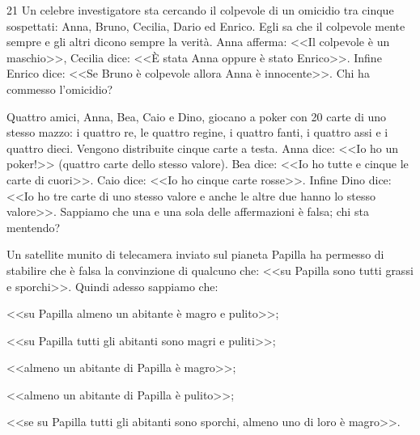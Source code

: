 \begin{esercizio}
\label{ese:1.21}
 21   Un celebre investigatore sta cercando il colpevole di un omicidio tra cinque sospettati: Anna, Bruno, Cecilia, Dario ed Enrico. Egli sa che il colpevole mente sempre e gli altri dicono sempre la verità. Anna afferma: <<Il colpevole è un maschio>>, Cecilia dice: <<\`E stata Anna oppure è stato Enrico>>. Infine Enrico dice: <<Se Bruno è colpevole allora Anna è innocente>>. Chi ha commesso l'omicidio?
\end{esercizio}

\begin{esercizio}
\label{ese:1.22}
Quattro amici, Anna, Bea, Caio e Dino, giocano a poker con 20 carte di uno stesso mazzo: i quattro re, le quattro regine, i quattro fanti, i quattro assi e i quattro dieci. Vengono distribuite cinque carte a testa. Anna dice: <<Io ho un poker!>> (quattro carte dello stesso valore). Bea dice: <<Io ho tutte e cinque le carte di cuori>>. Caio dice: <<Io ho cinque carte rosse>>. Infine Dino dice: <<Io ho tre carte di uno stesso valore e anche le altre due hanno lo stesso valore>>. Sappiamo che una e una sola delle affermazioni è falsa; chi sta mentendo?
\end{esercizio}

\begin{esercizio}
\label{ese:1.23}
Un satellite munito di telecamera inviato sul pianeta Papilla ha permesso di stabilire che è falsa la convinzione di qualcuno che: <<su Papilla sono tutti grassi e sporchi>>. Quindi adesso sappiamo che:
\begin{enumeratea}
\item <<su Papilla almeno un abitante è magro e pulito>>;
\item <<su Papilla tutti gli abitanti sono magri e puliti>>;
\item <<almeno un abitante di Papilla è magro>>;
\item <<almeno un abitante di Papilla è pulito>>;
\item <<se su Papilla tutti gli abitanti sono sporchi, almeno uno di loro è magro>>.
\end{enumeratea}
\end{esercizio}

